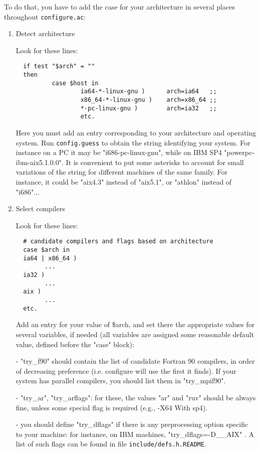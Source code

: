 \documentclass[12pt,a4paper]{article}
\def\configurac{\texttt{configure.ac}}
\begin{document}
To do that, you have to add the case for your architecture in several
places throughout \configurac:
\begin{enumerate}
\item Detect architecture

Look for these lines:
\begin{verbatim}
  if test "$arch" = ""
  then
          case $host in
                  ia64-*-linux-gnu )      arch=ia64   ;;
                  x86_64-*-linux-gnu )    arch=x86_64 ;;
                  *-pc-linux-gnu )        arch=ia32   ;;
                  etc.
\end{verbatim}
Here you must add an entry corresponding to your architecture and
operating system.  Run \texttt{config.guess} to obtain the string identifying
your system.
For instance on a PC it may be "i686-pc-linux-gnu", while on IBM SP4
"powerpc-ibm-aix5.1.0.0".  It is convenient to put some asterisks to
account for small variations of the string for different machines of
the same family.  For instance, it could be "aix4.3" instead of
"aix5.1", or "athlon" instead of "i686"...

\item  Select compilers

Look for these lines:

\begin{verbatim}
  # candidate compilers and flags based on architecture
  case $arch in
  ia64 | x86_64 )
        ...
  ia32 )
        ...
  aix )
        ...
  etc.
\end{verbatim}

Add an entry for your value of \$arch, and set there the appropriate
values for several variables, if needed (all variables are assigned
some reasonable default value, defined before the "case" block):

- "try\_f90" should contain the list of candidate Fortran 90 compilers,
in order of decreasing preference (i.e. configure will use the first
it finds).  If your system has parallel compilers, you should list
them in "try\_mpif90".

- "try\_ar", "try\_arflags": for these, the values "ar" and "ruv" should
be always fine, unless some special flag is required (e.g., -X64
With sp4).

- you should define "try\_dflags" if there is any preprocessing
option specific to your machine: for instance, on IBM machines,
"try\_dflags=-D\_\_AIX" . A list of such flags can be found in file
\texttt{include/defs.h.README}.


\end{enumerate}
\end{document}
